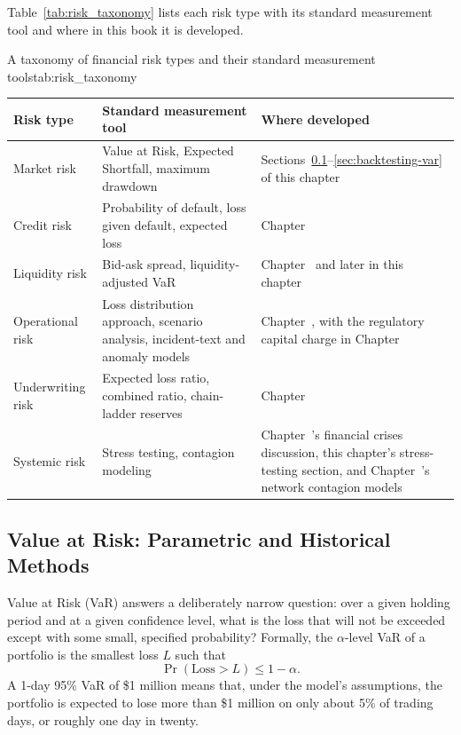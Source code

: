 \documentclass[../ai_in_finance]{subfiles}
\begin{document}
Table~\ref{tab:risk_taxonomy} lists each risk type with its standard measurement tool and where in this book it is developed.

\begin{booktable}[htbp]{A taxonomy of financial risk types and their standard measurement tools}{tab:risk_taxonomy}
\begin{tabular}{L{2.8cm}L{4.6cm}L{6.2cm}}
\toprule
Risk type & Standard measurement tool & Where developed \\
\midrule
Market risk & Value at Risk, Expected Shortfall, maximum drawdown & Sections~\ref{sec:var}--\ref{sec:backtesting-var} of this chapter \\
Credit risk & Probability of default, loss given default, expected loss & Chapter~ \\
Liquidity risk & Bid-ask spread, liquidity-adjusted VaR & Chapter~ and later in this chapter \\
Operational risk & Loss distribution approach, scenario analysis, incident-text and anomaly models & Chapter~, with the regulatory capital charge in Chapter~ \\
Underwriting risk & Expected loss ratio, combined ratio, chain-ladder reserves & Chapter~ \\
Systemic risk & Stress testing, contagion modeling & Chapter~'s financial crises discussion, this chapter's stress-testing section, and Chapter~'s network contagion models \\
\bottomrule
\end{tabular}
\end{booktable}

\subsection{Value at Risk: Parametric and Historical Methods}
\label{sec:var}

Value at Risk (VaR) answers a deliberately narrow question: over a given holding period and at a given confidence level, what is the loss that will not be exceeded except with some small, specified probability? Formally, the $\alpha$-level VaR of a portfolio is the smallest loss $L$ such that
$$\Pr(\text{Loss} > L) \le 1-\alpha.$$
A 1-day 95\% VaR of \$1 million means that, under the model's assumptions, the portfolio is expected to lose more than \$1 million on only about 5\% of trading days, or roughly one day in twenty.
\end{document}
